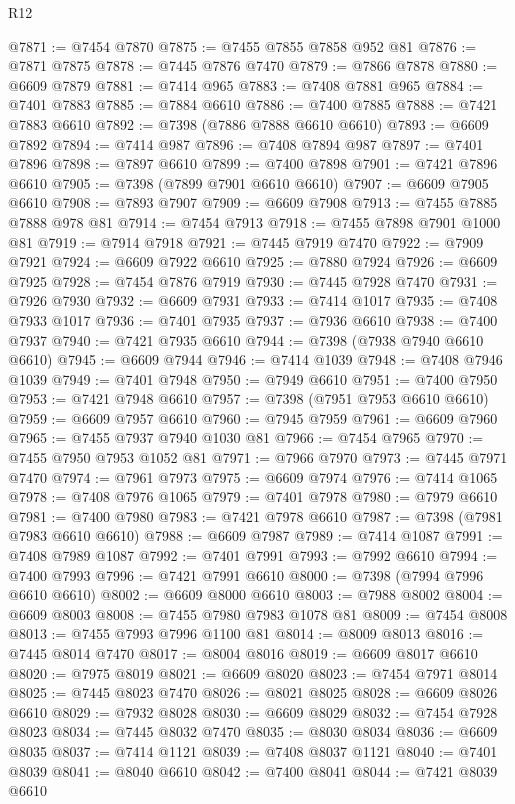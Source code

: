 \begin{lexlean}{R12}
\begin{coremodule}
@7871 := @7454 @7870
@7875 := @7455 @7855 @7858 @952 @81
@7876 := @7871 @7875
@7878 := @7445 @7876 @7470
@7879 := @7866 @7878
@7880 := @6609 @7879
@7881 := @7414 @965
@7883 := @7408 @7881 @965
@7884 := @7401 @7883
@7885 := @7884 @6610
@7886 := @7400 @7885
@7888 := @7421 @7883 @6610
@7892 := @7398 (@7886 @7888 @6610 @6610)
@7893 := @6609 @7892
@7894 := @7414 @987
@7896 := @7408 @7894 @987
@7897 := @7401 @7896
@7898 := @7897 @6610
@7899 := @7400 @7898
@7901 := @7421 @7896 @6610
@7905 := @7398 (@7899 @7901 @6610 @6610)
@7907 := @6609 @7905 @6610
@7908 := @7893 @7907
@7909 := @6609 @7908
@7913 := @7455 @7885 @7888 @978 @81
@7914 := @7454 @7913
@7918 := @7455 @7898 @7901 @1000 @81
@7919 := @7914 @7918
@7921 := @7445 @7919 @7470
@7922 := @7909 @7921
@7924 := @6609 @7922 @6610
@7925 := @7880 @7924
@7926 := @6609 @7925
@7928 := @7454 @7876 @7919
@7930 := @7445 @7928 @7470
@7931 := @7926 @7930
@7932 := @6609 @7931
@7933 := @7414 @1017
@7935 := @7408 @7933 @1017
@7936 := @7401 @7935
@7937 := @7936 @6610
@7938 := @7400 @7937
@7940 := @7421 @7935 @6610
@7944 := @7398 (@7938 @7940 @6610 @6610)
@7945 := @6609 @7944
@7946 := @7414 @1039
@7948 := @7408 @7946 @1039
@7949 := @7401 @7948
@7950 := @7949 @6610
@7951 := @7400 @7950
@7953 := @7421 @7948 @6610
@7957 := @7398 (@7951 @7953 @6610 @6610)
@7959 := @6609 @7957 @6610
@7960 := @7945 @7959
@7961 := @6609 @7960
@7965 := @7455 @7937 @7940 @1030 @81
@7966 := @7454 @7965
@7970 := @7455 @7950 @7953 @1052 @81
@7971 := @7966 @7970
@7973 := @7445 @7971 @7470
@7974 := @7961 @7973
@7975 := @6609 @7974
@7976 := @7414 @1065
@7978 := @7408 @7976 @1065
@7979 := @7401 @7978
@7980 := @7979 @6610
@7981 := @7400 @7980
@7983 := @7421 @7978 @6610
@7987 := @7398 (@7981 @7983 @6610 @6610)
@7988 := @6609 @7987
@7989 := @7414 @1087
@7991 := @7408 @7989 @1087
@7992 := @7401 @7991
@7993 := @7992 @6610
@7994 := @7400 @7993
@7996 := @7421 @7991 @6610
@8000 := @7398 (@7994 @7996 @6610 @6610)
@8002 := @6609 @8000 @6610
@8003 := @7988 @8002
@8004 := @6609 @8003
@8008 := @7455 @7980 @7983 @1078 @81
@8009 := @7454 @8008
@8013 := @7455 @7993 @7996 @1100 @81
@8014 := @8009 @8013
@8016 := @7445 @8014 @7470
@8017 := @8004 @8016
@8019 := @6609 @8017 @6610
@8020 := @7975 @8019
@8021 := @6609 @8020
@8023 := @7454 @7971 @8014
@8025 := @7445 @8023 @7470
@8026 := @8021 @8025
@8028 := @6609 @8026 @6610
@8029 := @7932 @8028
@8030 := @6609 @8029
@8032 := @7454 @7928 @8023
@8034 := @7445 @8032 @7470
@8035 := @8030 @8034
@8036 := @6609 @8035
@8037 := @7414 @1121
@8039 := @7408 @8037 @1121
@8040 := @7401 @8039
@8041 := @8040 @6610
@8042 := @7400 @8041
@8044 := @7421 @8039 @6610

\end{coremodule}
\end{lexlean}
